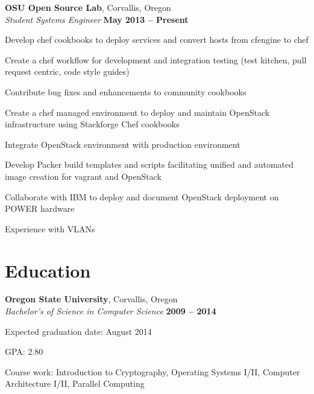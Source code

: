 \documentclass[margin,line]{resume}
\begin{document}
\begin{resume}
    \textbf{OSU Open Source Lab}, Corvallis, Oregon \vspace{2mm}\\\vspace{1mm}%
    \textsl{Student Systems Engineer} \hfill \textbf{May 2013 -- Present}\\
    \begin{list2}
        \item Develop chef cookbooks to deploy services and convert hosts from cfengine to chef
        \item Create a chef workflow for development and integration testing (test kitchen, pull request centric, code style guides)
        \item Contribute bug fixes and enhancements to community cookbooks
        \item Create a chef managed environment to deploy and maintain OpenStack infrastructure using Stackforge Chef cookbooks
        \item Integrate OpenStack environment with production environment
        \item Develop Packer build templates and scripts facilitating unified and automated image creation for vagrant and OpenStack
        \item Collaborate with IBM to deploy and document OpenStack deployment on POWER hardware
        \item Experience with VLANs\\
    \end{list2}\vspace{-1.5mm}


    \section{\mysidestyle Education}

    \textbf{Oregon State University}, Corvallis, Oregon \vspace{2mm}\\\vspace{1mm}%
    \textsl{Bachelor's of Science in Computer Science} \hfill \textbf{ 2009 -- 2014}\vspace{-3mm}\\\vspace{-1mm}%
    \begin{list2}
        \item Expected graduation date: August 2014
        \item GPA:  2.80
        \item Course work: Introduction to Cryptography, Operating Systems I/II,
              Computer Architecture I/II, Parallel Computing\\
    \end{list2}\vspace{-1.5mm}



\end{resume}
\end{document}
